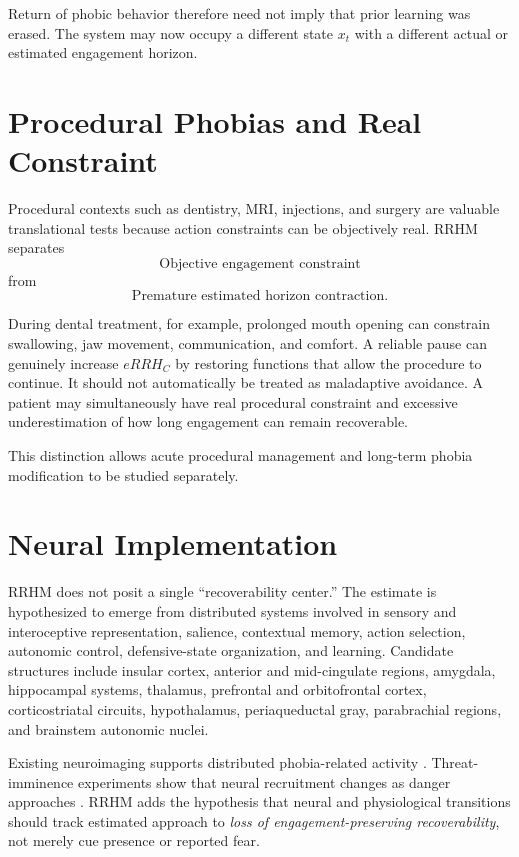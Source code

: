\documentclass[11pt]{article}
\begin{document}
Return of phobic behavior therefore need not imply that prior learning was erased. The system may now occupy a different state $x_t$ with a different actual or estimated engagement horizon.

\section{Procedural Phobias and Real Constraint}

Procedural contexts such as dentistry, MRI, injections, and surgery are valuable translational tests because action constraints can be objectively real. RRHM separates
\[
\text{Objective engagement constraint}
\]
from
\[
\text{Premature estimated horizon contraction}.
\]

During dental treatment, for example, prolonged mouth opening can constrain swallowing, jaw movement, communication, and comfort. A reliable pause can genuinely increase $eRRH_C$ by restoring functions that allow the procedure to continue. It should not automatically be treated as maladaptive avoidance. A patient may simultaneously have real procedural constraint and excessive underestimation of how long engagement can remain recoverable.

This distinction allows acute procedural management and long-term phobia modification to be studied separately.

\section{Neural Implementation}

RRHM does not posit a single ``recoverability center.'' The estimate is hypothesized to emerge from distributed systems involved in sensory and interoceptive representation, salience, contextual memory, action selection, autonomic control, defensive-state organization, and learning. Candidate structures include insular cortex, anterior and mid-cingulate regions, amygdala, hippocampal systems, thalamus, prefrontal and orbitofrontal cortex, corticostriatal circuits, hypothalamus, periaqueductal gray, parabrachial regions, and brainstem autonomic nuclei.

Existing neuroimaging supports distributed phobia-related activity \cite{linares2012,etkin2007}. Threat-imminence experiments show that neural recruitment changes as danger approaches \cite{mobbs2007}. RRHM adds the hypothesis that neural and physiological transitions should track estimated approach to \emph{loss of engagement-preserving recoverability}, not merely cue presence or reported fear.
\end{document}
